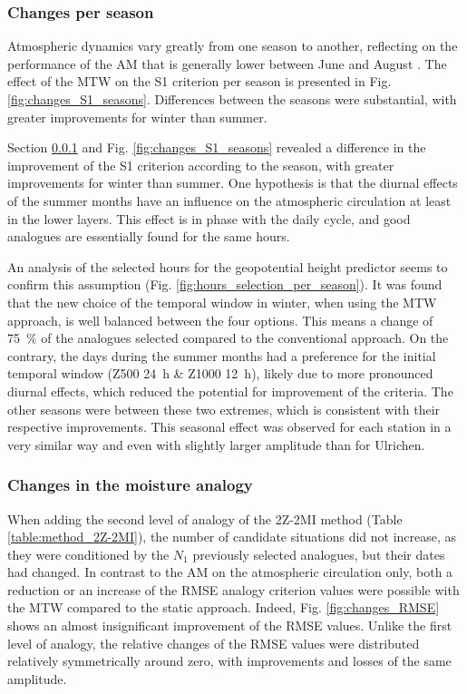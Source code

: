 \documentclass[hess, manuscript]{copernicus}
\begin{document}
	
	\subsubsection{Changes per season}
	\label{sec:seasonal_effect}
	
	Atmospheric dynamics vary greatly from one season to another, reflecting on the performance of the AM that is generally lower between June and August \citep{Bliefernicht2010}. The effect of the MTW on the S1 criterion per season is presented in Fig. \ref{fig:changes_S1_seasons}. Differences between the seasons were substantial, with greater improvements for winter than summer. 
	
	Section \ref{sec:seasonal_effect} and Fig. \ref{fig:changes_S1_seasons} revealed a difference in the improvement of the S1 criterion according to the season, with greater improvements for winter than summer. One hypothesis is that the diurnal effects of the summer months have an influence on the atmospheric circulation at least in the lower layers. This effect is in phase with the daily cycle, and good analogues are essentially found for the same hours.
	
	An analysis of the selected hours for the geopotential height predictor seems to confirm this assumption (Fig. \ref{fig:hours_selection_per_season}). It was found that the new choice of the temporal window in winter, when using the MTW approach, is well balanced between the four options. This means a change of 75~\% of the analogues selected compared to the conventional approach. On the contrary, the days during the summer months had a preference for the initial temporal window (Z500 24~h \& Z1000 12~h), likely due to more pronounced diurnal effects, which reduced the potential for improvement of the criteria. The other seasons were between these two extremes, which is consistent with their respective improvements. This seasonal effect was observed for each station in a very similar way and even with slightly larger amplitude than for Ulrichen.
	
	
	\subsubsection{Changes in the moisture analogy}
	\label{sec:perf_2Z-2MI}
	
	When adding the second level of analogy of the 2Z-2MI method (Table \ref{table:method_2Z-2MI}), the number of candidate situations did not increase, as they were conditioned by the $N_{1}$ previously selected analogues, but their dates had changed. In contrast to the AM on the atmospheric circulation only, both a reduction or an increase of the RMSE analogy criterion values were possible with the MTW compared to the static approach. Indeed, Fig. \ref{fig:changes_RMSE} shows an almost insignificant improvement of the RMSE values. Unlike the first level of analogy, the relative changes of the RMSE values were distributed relatively symmetrically around zero, with improvements and losses of the same amplitude.
	
\end{document}
